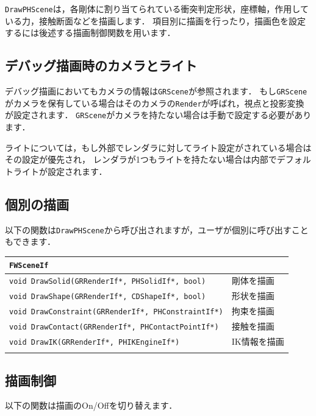 \texttt{DrawPHScene}は，各剛体に割り当てられている衝突判定形状，座標軸，作用している力，接触断面などを描画します．
\KLUDGE 項目別に描画を行ったり，描画色を設定するには後述する描画制御関数を用います．

\subsection*{デバッグ描画時のカメラとライト}

\KLUDGE デバッグ描画においてもカメラの情報は\texttt{GRScene}が参照されます．
\KLUDGE もし\texttt{GRScene}がカメラを保有している場合はそのカメラの\texttt{Render}が呼ばれ，視点と投影変換が設定されます．
\texttt{GRScene}がカメラを持たない場合は手動で設定する必要があります．

\KLUDGE ライトについては，もし外部でレンダラに対してライト設定がされている場合はその設定が優先され，
\KLUDGE レンダラが1つもライトを持たない場合は内部でデフォルトライトが設定されます．

\subsection*{個別の描画}

\KLUDGE 以下の関数は\texttt{DrawPHScene}から呼び出されますが，ユーザが個別に呼び出すこともできます．

\noindent
\begin{tabular}{p{.7\hsize}p{.2\hsize}}
\\
\texttt{FWSceneIf}												\\ \midrule
\texttt{void DrawSolid(GRRenderIf*, PHSolidIf*, bool)}		&	剛体を描画\\
\texttt{void DrawShape(GRRenderIf*, CDShapeIf*, bool)}		&	形状を描画\\
\texttt{void DrawConstraint(GRRenderIf*, PHConstraintIf*)}	&	拘束を描画\\
\texttt{void DrawContact(GRRenderIf*, PHContactPointIf*)}	&	接触を描画\\
\texttt{void DrawIK(GRRenderIf*, PHIKEngineIf*)}			&	IK情報を描画\\
\\
\end{tabular}

\subsection*{描画制御}

\KLUDGE 以下の関数は描画のOn/Offを切り替えます．

